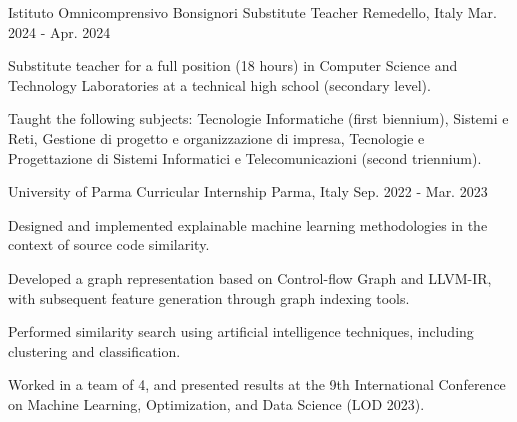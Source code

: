 \begin{cventries}

\cventry
    {Istituto Omnicomprensivo Bonsignori} %
    {Substitute Teacher} %
    {Remedello, Italy} %
    {Mar. 2024 - Apr. 2024} %
    {
        \begin{cvitems} %
            \item {Substitute teacher for a full position (18 hours) in Computer Science
            and Technology Laboratories at a technical high school (secondary level).}
            \item {Taught the following subjects: Tecnologie Informatiche (first biennium),
            Sistemi e Reti, Gestione di progetto e organizzazione di impresa,
            Tecnologie e Progettazione di Sistemi Informatici e Telecomunicazioni
            (second triennium).}
        \end{cvitems}
    }

\cventry
    {University of Parma} %
    {Curricular Internship} %
    {Parma, Italy} %
    {Sep. 2022 - Mar. 2023} %
    {
        \begin{cvitems} %
            \item {Designed and implemented explainable machine learning methodologies
            in the context of source code similarity.}
            \item {Developed a graph representation based on Control-flow Graph and
            LLVM-IR, with subsequent feature generation through graph indexing tools.}
            \item {Performed similarity search using artificial intelligence techniques,
            including clustering and classification.}
            \item {Worked in a team of 4, and presented results at the 9th International
            Conference on Machine Learning, Optimization, and Data Science (LOD 2023).}
        \end{cvitems}
    }


\end{cventries}
